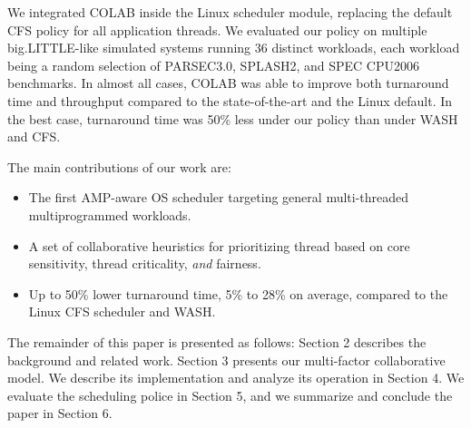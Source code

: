 We integrated COLAB inside the Linux scheduler module, replacing the default CFS policy for all application threads. We evaluated our policy on multiple big.LITTLE-like simulated systems running 36 distinct workloads, each workload being a random selection of PARSEC3.0, SPLASH2, and SPEC CPU2006 benchmarks. In almost all cases, COLAB was able to improve both turnaround time and throughput compared to the state-of-the-art and the Linux default. In the best case, turnaround time was 50\% less under our policy than under WASH and CFS.


The main contributions of our work are:
\begin{itemize}
\item The first AMP-aware OS scheduler targeting general multi-threaded multiprogrammed workloads.
\item A set of collaborative heuristics for prioritizing thread based on core sensitivity, thread criticality, \emph{and} fairness.
\item Up to 50\% lower turnaround time, 5\% to 28\% on average, compared to the Linux CFS scheduler and WASH.
\end{itemize}

The remainder of this paper is presented as follows: Section 2 describes the background and related work. Section 3 presents our multi-factor collaborative model. We describe its implementation and analyze its operation in Section 4. We evaluate the scheduling police in Section 5, and we summarize and conclude the paper in Section 6.  
